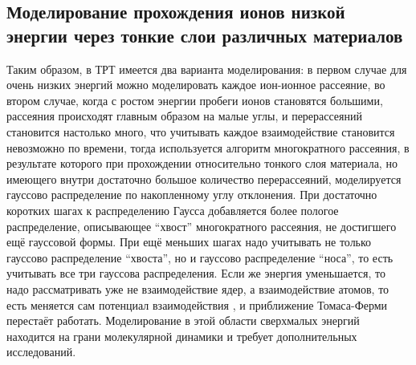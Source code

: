 \documentclass[a4paper,12pt]{article}
\begin{document}
\begin{large}
\subsection{Моделирование прохождения ионов низкой энергии через тонкие слои различных материалов}
\label{subPol3}

	Таким образом, в ТРТ имеется два варианта моделирования: в первом случае для очень низких энергий можно моделировать каждое ион-ионное рассеяние, во втором случае, когда с ростом энергии пробеги ионов становятся большими, рассеяния происходят главным образом на малые углы, и перерассеяний становится настолько много, что учитывать каждое взаимодействие становится невозможно по времени, тогда используется алгоритм многократного рассеяния, в результате которого при прохождении относительно тонкого слоя материала, но имеющего внутри достаточно большое количество перерассеяний, моделируется гауссово распределение по накопленному углу отклонения.
	При достаточно коротких шагах к распределению Гаусса добавляется более пологое распределение, описывающее ``хвост'' многократного рассеяния, не достигшего ещё гауссовой формы.
	При ещё меньших шагах надо учитывать не только гауссово распределение ``хвоста'', но и гауссово распределение ``носа'', то есть учитывать все три гауссова распределения.
	Если же энергия уменьшается, то надо рассматривать уже не взаимодействие ядер, а взаимодействие атомов, то есть меняется сам потенциал взаимодействия \cite{MSLEn}, и приближение Томаса-Ферми перестаёт работать.
	Моделирование в этой области сверхмалых энергий находится на грани молекулярной динамики и требует дополнительных исследований.
	

\end{large}
\end{document}
